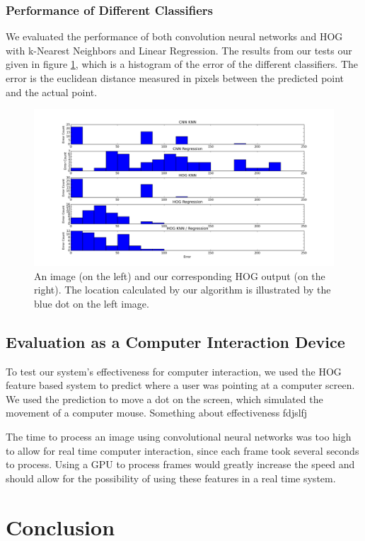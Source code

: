 \documentclass[10pt,twocolumn,letterpaper]{article}
\begin{document}
\subsubsection{Performance of Different Classifiers}
We evaluated the performance of both convolution neural networks and HOG with k-Nearest Neighbors and Linear Regression. The results from our tests our given in figure \ref{fig:hist}, which is a histogram of the error of the different classifiers. The error is the euclidean distance measured in pixels between the predicted point and the actual point.
\begin{figure}
	\begin{center}
		\includegraphics[width=0.9\linewidth]{figures/ClassifierErrorHist.png}
	\end{center}
	\caption{An image (on the left) and our corresponding HOG output (on the right). The location calculated by our algorithm is illustrated by the blue dot on the left image.}
	\label{fig:hist}
\end{figure}
\subsection{Evaluation as a Computer Interaction Device}

To test our system's effectiveness for computer interaction, we used the HOG feature based system to predict where a user was pointing at a computer screen.  We used the prediction to move a dot on the screen, which simulated the movement of a computer mouse.  Something about effectiveness fdjslfj

The time to process an image using convolutional neural networks was too high to allow for real time computer interaction, since each frame took several seconds to process.  Using a GPU to process frames would greatly increase the speed and should allow for the possibility of using these features in a real time system.

\section{Conclusion}


{\small


}
\end{document}
